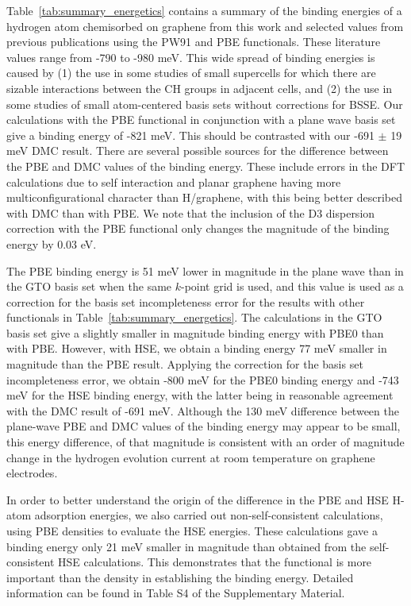 Table~\ref{tab:summary_energetics} contains a summary of the binding energies of a hydrogen atom chemisorbed on graphene from this work and selected values from previous publications using the PW91 and PBE functionals.
These literature values range from -790 to -980 meV.
This wide spread of binding energies is caused by (1) the use in some studies of small supercells for which there are sizable interactions between the CH groups in adjacent cells, and (2) the use in some studies of small atom-centered basis sets without corrections for BSSE.
Our calculations with the PBE functional in conjunction with a plane wave basis set give a binding energy of -821 meV. 
This should be contrasted with our -691 $\pm$ 19 meV DMC result.
There are several possible sources for the difference between the PBE and DMC values of the binding energy. 
These include errors in the DFT calculations due to self interaction and planar graphene having more multiconfigurational character than H/graphene, with this being better described with DMC than with PBE.
We note that the inclusion of the D3 dispersion correction with the PBE functional only changes the magnitude of the binding energy by 0.03 eV.

The PBE binding energy is 51 meV lower in magnitude in the plane wave than in the GTO basis set when the same $k$-point grid is used, and this value is used as a correction for the basis set incompleteness error for the results with other functionals in Table~\ref{tab:summary_energetics}.
The calculations in the GTO basis set give a slightly smaller in magnitude binding energy with PBE0 than with PBE.
However, with HSE, we obtain a binding energy 77 meV smaller in magnitude than the PBE result.
Applying the correction for the basis set incompleteness error, we obtain -800 meV for the PBE0 binding energy and -743 meV for the HSE binding energy, with the latter being in reasonable agreement with the DMC result of -691 meV.
Although the 130 meV difference between the plane-wave PBE and DMC values of the binding energy may appear to be small, this energy difference, of that magnitude is consistent with an order of magnitude change in the hydrogen evolution current at room temperature on graphene electrodes.\cite{10.1021/acsami.1c21821}


 
In order to better understand the origin of the difference in the PBE and HSE H-atom adsorption energies, we also carried out non-self-consistent calculations, using PBE densities to evaluate the HSE energies.  These calculations gave a binding energy only 21 meV smaller in magnitude than obtained from the self-consistent HSE calculations.  This demonstrates that the functional is more important than the density in establishing the binding energy. Detailed information can be found in Table S4 of the Supplementary Material.
 
